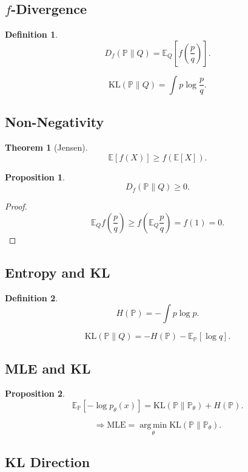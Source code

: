 \documentclass[12pt,oneside]{book}
\numberwithin{equation}{section}
\theoremstyle{definition}
\newtheorem{definition}{Definition}[section]
\theoremstyle{plain}
\newtheorem{theorem}{Theorem}[section]
\newtheorem{proposition}{Proposition}[section]
\theoremstyle{remark}
\newcommand{\E}{\mathbb{E}}
\newcommand{\Prob}{\mathbb{P}}
\newcommand{\argmin}{\operatorname*{arg\,min}}
\begin{document}
\subsection{$f$-Divergence}

\begin{definition}
\[
D_f(\Prob \| Q)
=
\E_Q\left[f\left(\frac{p}{q}\right)\right].
\]
\end{definition}

\[
\mathrm{KL}(\Prob \| Q)
=
\int p\log\frac{p}{q}.
\]


\subsection{Non-Negativity}

\begin{theorem}[Jensen]
\[
\E[f(X)] \ge f(\E[X]).
\]
\end{theorem}

\begin{proposition}
\[
D_f(\Prob \| Q) \ge 0.
\]
\end{proposition}

\begin{proof}
\[
\E_Q f\left(\frac{p}{q}\right)
\ge
f\left(\E_Q \frac{p}{q}\right)
= f(1)=0.
\]
\end{proof}


\subsection{Entropy and KL}

\begin{definition}
\[
H(\Prob) = -\int p\log p.
\]
\end{definition}

\[
\mathrm{KL}(\Prob \| Q)
=
-H(\Prob) - \E_\Prob[\log q].
\]


\subsection{MLE and KL}

\begin{proposition}
\[
\E_\Prob[-\log p_\theta(x)]
=
\mathrm{KL}(\Prob \| \Prob_\theta) + H(\Prob).
\]
\end{proposition}

\[
\Rightarrow
\text{MLE} = \argmin_\theta \mathrm{KL}(\Prob \| \Prob_\theta).
\]


\subsection{KL Direction}
\end{document}
